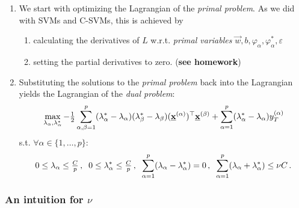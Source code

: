 \begin{frame}\frametitle{\subsecname}

\begin{enumerate}
\item We start with optimizing the Lagrangian of the \emph{primal problem}. As we did with SVMs and C-SVMs, this is achieved by
\begin{enumerate}
\item calculating the derivatives of $L$ w.r.t. \emph{primal variables} $\vec w, b, \varphi_\alpha, \varphi_\alpha^*, \varepsilon$
\item setting the partial derivatives to zero. (\textbf{see homework})
\end{enumerate}

\item Substituting the solutions to the \emph{primal problem} back into the Lagrangian yields the Lagrangian of the \emph{dual problem}:
		\begin{equation}
		  \max_{\lambda_{\alpha}, \lambda_{\alpha}^*}
		  - {\textstyle \frac{1}{2}}\sum_{\alpha,\beta=1}^p(\lambda_{\alpha}^* -
		  \lambda_{\alpha}) (\lambda_{\beta}^* - \lambda_{\beta})
		  (\underline{\mathbf{x}}^{(\alpha)})^\top\underline{\mathbf{x}}^{(\beta)} +
		  \sum_{\alpha=1}^p(\lambda_{\alpha}^* 
		  - \lambda_{\alpha})y_T^{(\alpha)}
		  \nonumber
		\end{equation}
		s.t. $\forall \alpha \in \{1,\ldots,p\}$:
		$$
		  0 \leq \lambda_{\alpha} \leq {\textstyle \frac{C}{p}}
		  \,, \;\;
		  0 \leq \lambda_{\alpha}^* \leq {\textstyle \frac{C}{p}}
		  \,, \;\;
		  \sum_{\alpha=1}^p(\lambda_{\alpha} - \lambda_{\alpha}^*) = 0 
		  \,, \;\;
		  \sum_{\alpha=1}^p(\lambda_{\alpha} + \lambda_{\alpha}^*) 
		  \leq  \nu C \,.  \nonumber
		$$
\end{enumerate}


\end{frame}


\subsubsection{An intuition for $\nu$}\label{sec:intuitionnu}

